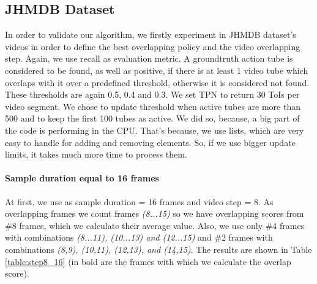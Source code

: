 \subsection{JHMDB Dataset}

In order to validate our algorithm, we firstly experiment in JHMDB dataset's videos in order to define the best overlapping policy and
the video overlapping step. Again, we use recall as evaluation metric. A groundtruth action tube is considered to be found, as well as positive,
if there is at least 1 video tube which overlaps with it over a predefined threshold, otherwise it is considered not found.  These thresholds are again 0.5, 0.4 and 0.3.
We set TPN to return 30 ToIs per video segment.
We chose to update threshold when active tubes are more than 500 and to keep the first 100 tubes as active. We did so, because, a big part of the
code is performing in the CPU. That's because, we use lists, which are very easy to handle for adding and removing elements. So, if we use bigger update
limits, it takes much more time to process them.

\paragraph{Sample duration equal to 16 frames} At first, we use as sample duration = 16 frames and video step = 8. As overlapping frames we count frames
\textit{(8...15)} so we have overlapping scores from \#8 frames, which we calculate their average value. Also, we use only \#4 frames with combinations \textit{(8...11), (10...13) and (12...15)} and 
\#2 frames with combinations \textit{(8,9), (10,11), (12,13), and (14,15)}. The results are shown in Table \ref{table:step8_16} (in bold are
the frames with which we calculate the overlap score).

